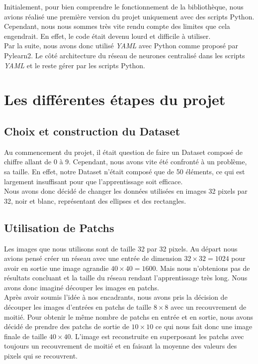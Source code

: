 \documentclass[12pt, a4paper]{article}
\begin{document}
Initialement, pour bien comprendre le fonctionnement de la bibliothèque, nous avions réalisé une première version du projet uniquement avec des scripts Python. 
\\ Cependant, nous nous sommes très vite rendu compte des limites que cela engendrait. En effet, le code était devenu lourd et difficile à utiliser. 
\\

Par la suite, nous avons donc utilisé \emph{YAML} avec Python comme proposé par Pylearn2. Le côté architecture du réseau de neurones centralisé dans les scripts \emph{YAML} et le reste gérer par les scripts Python. 

\section{Les différentes étapes du projet}
	\subsection{Choix et construction du Dataset}
Au commencement du projet, il était question de faire un Dataset composé de chiffre allant de 0 à 9. 
Cependant, nous avons vite été confronté à un problème, sa taille. En effet, notre Dataset n'était composé que de 50 éléments, ce qui est largement insuffisant pour que l'apprentissage soit efficace.
\\ Nous avons donc décidé de changer les données utilisées en images 32 pixels par 32, noir et blanc, représentant des ellipses et des rectangles.
 
	\subsection{Utilisation de Patchs}
Les images que nous utilisons sont de taille 32 par 32 pixels. Au départ nous avions pensé créer un réseau avec une entrée de dimension $32 \times 32 = 1024$ pour avoir en sortie une image agrandie $40 \times 40 = 1600$. Mais nous n'obtenions pas de résultats concluant et la taille du réseau rendant l'apprentissage très long. Nous avons donc imaginé découper les images en patchs.
\\

Après avoir soumis l'idée à nos encadrants, nous avons pris la décision de découper les images d'entrées en patchs de taille $8 \times 8$ avec un recouvrement de moitié. Pour obtenir le même nombre de patchs en entrée et en sortie, nous avons décidé de prendre des patchs de sortie de $10 \times 10$ ce qui nous fait donc une image finale de taille $40 \times 40$. L'image est reconstruite en superposant les patchs avec toujours un recouvrement de moitié et en faisant la moyenne des valeurs des pixels qui se recouvrent. 
\\
\end{document}
